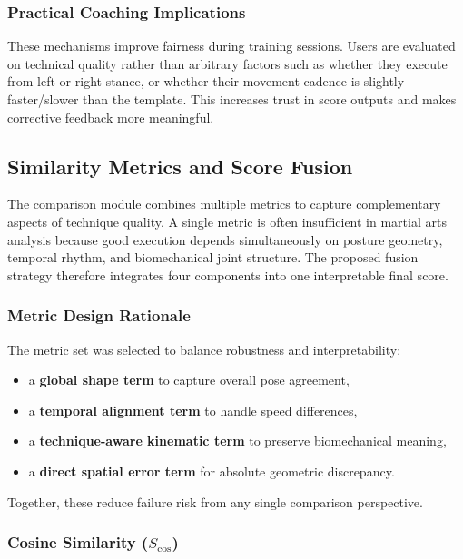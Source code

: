 \documentclass[12pt]{article}
\begin{document}
{\subsubsection{Practical Coaching Implications}

These mechanisms improve fairness during training sessions. Users are evaluated on technical quality rather than arbitrary factors such as whether they execute from left or right stance, or whether their movement cadence is slightly faster/slower than the template. This increases trust in score outputs and makes corrective feedback more meaningful.

\subsection{Similarity Metrics and Score Fusion}

The comparison module combines multiple metrics to capture complementary aspects of technique quality. A single metric is often insufficient in martial arts analysis because good execution depends simultaneously on posture geometry, temporal rhythm, and biomechanical joint structure. The proposed fusion strategy therefore integrates four components into one interpretable final score.

\subsubsection{Metric Design Rationale}

The metric set was selected to balance robustness and interpretability:

\begin{itemize}
    \item a \textbf{global shape term} to capture overall pose agreement,
    \item a \textbf{temporal alignment term} to handle speed differences,
    \item a \textbf{technique-aware kinematic term} to preserve biomechanical meaning,
    \item a \textbf{direct spatial error term} for absolute geometric discrepancy.
\end{itemize}

Together, these reduce failure risk from any single comparison perspective.

\subsubsection{Cosine Similarity (\(S_{\text{cos}}\))}

}
\end{document}
